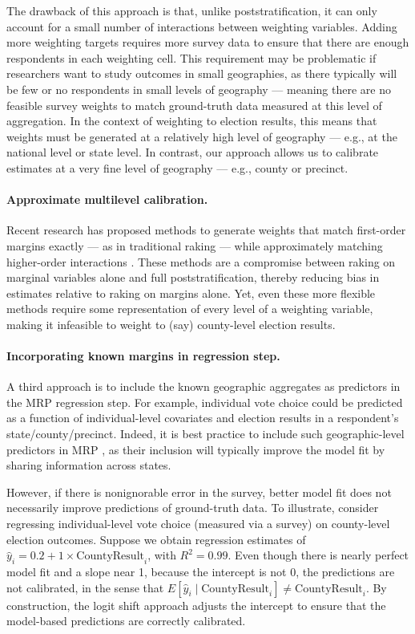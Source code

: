 The drawback of this approach is that, unlike poststratification, it can only account for a small number of interactions between weighting variables. 
Adding more weighting targets requires more survey data to ensure that there are enough respondents in each weighting cell.
This requirement may be problematic if researchers want to study outcomes in small geographies, as there typically will be few or no respondents in small levels of geography --- meaning there are no feasible survey weights to match ground-truth data measured at this level of aggregation.
In the context of weighting to election results, this means that weights must be generated at a relatively high level of geography --- e.g., at the national level or state level. 
In contrast, our approach allows us to calibrate estimates at a very fine level of geography --- e.g., county or precinct.


\paragraph{Approximate multilevel calibration.}
Recent research has proposed methods to generate weights that match first-order margins exactly --- as in traditional raking --- while approximately matching higher-order interactions \citep{BMFH:2023}. 
These methods are a compromise between raking on marginal variables alone and full poststratification, thereby reducing bias in estimates relative to raking on margins alone. 
Yet, even these more flexible methods require some representation of every level of a weighting variable, making it infeasible to weight to (say) county-level election results.

\paragraph{Incorporating known margins in regression step.}
A third approach is to include the known geographic aggregates as predictors in the MRP regression step. 
For example, individual vote choice could be predicted as a function of individual-level covariates and election results in a respondent's state/county/precinct.
Indeed, it is best practice to include such geographic-level predictors in MRP \citep{BH:2013}, as their inclusion will typically improve the model fit by sharing information across states.

However, if there is nonignorable error in the survey, better model fit does not necessarily improve predictions of ground-truth data. 
To illustrate, consider regressing individual-level vote choice (measured via a survey) on county-level election outcomes. 
Suppose we obtain regression estimates of $\hat{y}_{i} = 0.2 + 1 \times \text{CountyResult}_i$, with $R^2 = 0.99$. 
Even though there is nearly perfect model fit and a slope near 1, because the intercept is not 0, the predictions are not calibrated, in the sense that $E[\hat{y}_i \mid \text{CountyResult}_i] \ne \text{CountyResult}_i$. 
By construction, the logit shift approach adjusts the intercept to ensure that the model-based predictions are correctly calibrated.



